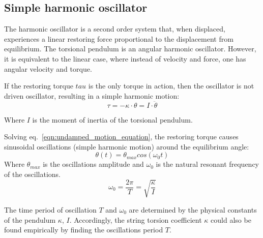 \documentclass[\main/master.tex]{subfiles}
\begin{document}
\subsection{Simple harmonic oscillator}
The harmonic oscillator is a second order system that, when displaced, experiences a linear restoring force proportional to the displacement from equilibrium. The torsional pendulum is an angular harmonic oscillator. However, it is equivalent to the linear case, where instead of velocity and force, one has angular velocity and torque.
\par\noindent
If the restoring torque $tau$ is the only torque in action, then the oscillator is not driven oscillator, resulting in a simple harmonic motion:
\begin{equation}
\tau = -\kappa\cdot\theta  = I\cdot\ddot{\theta}   \label{eqn:undamped_motion_equation}
\end{equation}
\par\noindent
Where $I$ is the moment of inertia of the torsional pendulum. 
\par\noindent
Solving eq.~\ref{eqn:undamped_motion_equation}, the restoring torque causes sinusoidal oscillations (simple harmonic motion) around the equilibrium angle:  
\begin{equation}
\theta(t) = \theta_{max}cos(\omega_0 t )    \label{eqn:undamped_motion_equation_solved}
\end{equation}
Where $\theta_{max}$ is the oscillations amplitude and $\omega_0$ is the natural resonant frequency of the oscillations.
\begin{equation}
\omega_0  = \frac{2\pi}{T} = \sqrt{\frac{\kappa}{I}}   \label{eqn:undamped_omega}
\end{equation}
\par\noindent
The time period of oscillation $T$ and $\omega_0$ are determined by the physical constants of the pendulum $\kappa$, $I$. Accordingly, the string torsion coefficient $\kappa$ could also be found empirically by finding the oscillations period $T$.
\end{document}
